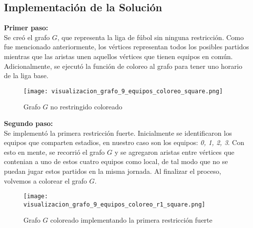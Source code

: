 \documentclass[11pt]{article}
\begin{document}
\begin{multicols}{2}
        \section{Implementación de la Solución}
            \textbf{Primer paso:}\\ 
            Se creó el grafo $G$, que representa la liga de fúbol sin ninguna restricción. Como fue mencionado anteriormente, los vértices representan todos los posibles partidos
            mientras que las aristas unen aquellos vértices que tienen equipos en común.
            Adicionalmente, se ejecutó la función de coloreo al grafo para tener uno horario de la liga base.
            \begin{figure}[H]
                \begin{center}
                    \texttt{[image: visualizacion\_grafo\_9\_equipos\_coloreo\_square.png]}  
                \caption{Grafo $G$ no restringido coloreado}
                \end{center}
            \end{figure}
            \textbf{Segundo paso:}\\
            Se implementó la primera restricción fuerte.
            Inicialmente se identificaron los equipos que comparten estadios, en nuestro caso son los equipos: \textit{0, 1, 2, 3}. 
            Con esto en mente, se recorrió el grafo $G$ y se agregaron aristas entre vértices que contenian a uno de estos cuatro equipos como local,
            de tal modo que no se puedan jugar estos partidos en la misma jornada. Al finalizar el proceso, volvemos a colorear el grafo $G$.
            \begin{figure}[H]
                \begin{center}
                    \texttt{[image: visualizacion\_grafo\_9\_equipos\_coloreo\_r1\_square.png]}  
                \caption{Grafo $G$ coloreado implementando la primera restricción fuerte}
                \end{center}
            \end{figure}


\end{multicols}
\end{document}
